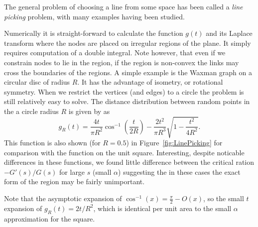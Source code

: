 \documentclass{article}
\begin{document}

The general problem of choosing a line from some space has been called
a {\em line picking} problem, with many examples having been studied.

Numerically it is straight-forward to calculate the function $g(t)$
and its Laplace transform where the nodes are placed on irregular
regions of the plane. It simply requires computation of a double
integral. Note however, that even if we constrain nodes to lie in the
region, if the region is non-convex the links may cross the boundaries
of the regions. A simple example is the Waxman graph on a circular disc
of radius $R$. It has the advantage of isometry, or rotational
symmetry.  When we restrict the vertices (and edges) to a circle the
problem is still relatively easy to solve. The distance distribution
between random points in the a circle radius $R$ is given by
\cite{tu00:_circle_line} as
\begin{equation}
   g_R(t)= \frac{4t}{\pi R^2} \cos^{-1}\left( \frac{t}{2R} \right)
          - \frac{2t^2}{\pi R^3} \sqrt{ 1- \frac{t^2}{4 R^2} }. 
  \label{eqn:circle}
\end{equation}
This function is also shown (for $R=0.5$) in
Figure~\ref{fig:LinePicking} for comparison with the function on the
unit square. Interesting, despite noticable differences in these
functions, we found little difference between the critical ration
$-G'(s)/G(s)$ for large $s$ (small $\alpha$) suggesting the in these
cases the exact form of the region may be fairly unimportant.

Note that the asymptotic expansion of $\cos^{-1}(x) = \frac{\pi}{2} -
O(x)$, so the small $t$ expansion of $g_R(t) = 2 t/R^2$, which is
identical per unit area to the small $\alpha$ approximation for the square.
\end{document}
